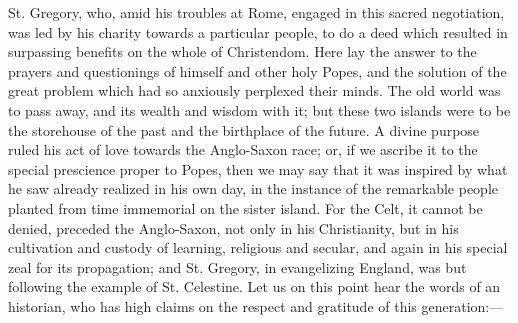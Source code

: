 St. Gregory, who, amid his troubles at Rome, engaged in this sacred
negotiation, was led by his charity towards a particular people, to do
a deed which resulted in surpassing benefits on the whole of
Christendom. Here lay the answer to the prayers and questionings of
himself and other holy Popes, and the solution of the great problem
which had so anxiously perplexed their minds. The old world was to
pass away, and its wealth and wisdom with it; but these two islands
were to be the storehouse of the past and the birthplace of the
future. A divine purpose ruled his act of love towards the Anglo-Saxon
race; or, if we ascribe it to the special prescience proper to Popes,
then we may say that it was inspired by what he saw already realized
in his own day, in the instance of the remarkable people planted from
time immemorial on the sister island. For the Celt, it cannot be
denied, preceded the Anglo-Saxon, not only in his Christianity, but in
his cultivation and custody of learning, religious and secular, and
again in his special zeal for its propagation; and St. Gregory, in
evangelizing England, was but following the example of St. Celestine.
Let us on this point hear the words of an historian, who has high
claims on the respect and gratitude of this generation:—

